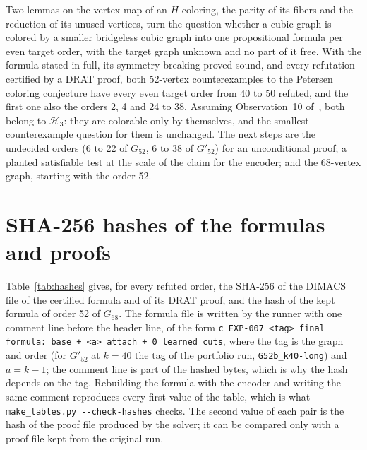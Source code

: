 \documentclass[11pt]{article}
\theoremstyle{definition}
\theoremstyle{remark}
\newcommand{\Hthree}{\mathcal{H}_3}
\newcommand{\Ga}{G_{52}}
\newcommand{\Gb}{G'_{52}}
\newcommand{\Gsix}{G_{68}}
\begin{document}
Two lemmas on the vertex map of an $H$-coloring, the parity of its fibers and the reduction of its unused vertices, turn the question whether a cubic graph is colored by a smaller bridgeless cubic graph into one propositional formula per even target order, with the target graph unknown and no part of it free.
With the formula stated in full, its symmetry breaking proved sound, and every refutation certified by a DRAT proof, both 52-vertex counterexamples to the Petersen coloring conjecture have every even target order from 40 to 50 refuted, and the first one also the orders 2, 4 and 24 to 38. Assuming Observation~10 of~\cite{GJMMMU2026}, both belong to $\Hthree$: they are colorable only by themselves, and
the smallest counterexample question for them is unchanged. The next steps are the undecided orders (6 to 22 of $\Ga$, 6 to 38 of $\Gb$) for an unconditional proof; a planted satisfiable test at the scale of the claim for the encoder; and the 68-vertex graph, starting with the order 52.

\appendix

\section{SHA-256 hashes of the formulas and proofs}\label{app:hashes}

Table~\ref{tab:hashes} gives, for every refuted order, the SHA-256 of the DIMACS file of the certified formula and of its DRAT proof, and the hash of the kept formula of order 52 of $\Gsix$. The formula file is written by the runner with one comment line before the header line, of the form \texttt{c EXP-007 <tag> final formula: base + <a> attach + 0 learned cuts}, where the tag
is the graph and order (for $\Gb$ at $k = 40$ the tag of the portfolio run, \texttt{G52b\_k40-long}) and $a = k - 1$; the comment line is part of the hashed bytes, which is why the hash depends on the tag. Rebuilding the formula with the encoder and writing the same comment reproduces every first value of the table, which is what \texttt{make\_tables.py -{}-check-hashes} checks. The second
value of each pair is the hash of the proof file produced by the solver; it can be compared only with a proof file kept from the original run.
\end{document}

